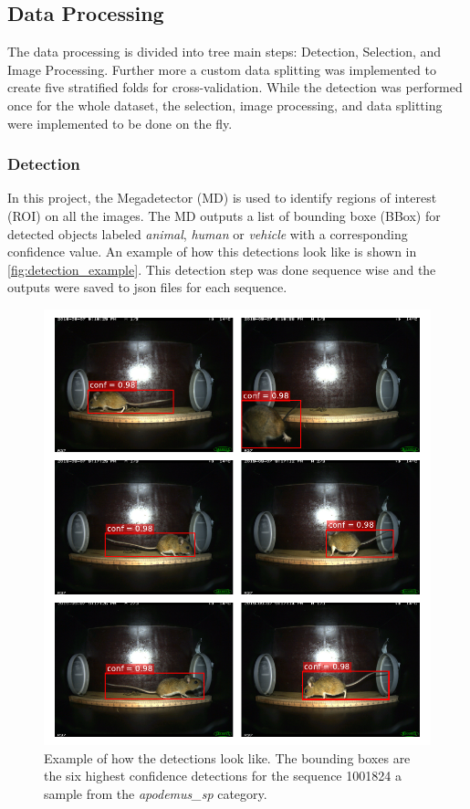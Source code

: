     \subsection{Data Processing}

    The data processing is divided into tree main steps: Detection, Selection, and Image Processing. 
    Further more a custom data splitting was implemented to create five stratified folds for cross-validation.
    While the detection was performed once for the whole dataset, the selection, image processing, and data splitting were implemented to be done on the fly.

        \subsubsection{Detection}
    
        In this project, the Megadetector (MD) \autocite{morrisEfficientPipelineCamera2025} is used to identify regions of interest (ROI) on all the images.
        The MD outputs a list of bounding boxe (BBox) for detected objects labeled \textit{animal}, \textit{human} or \textit{vehicle} with a corresponding confidence value.
        An example of how this detections look like is shown in \autoref{fig:detection_example}.
        This detection step was done sequence wise and the outputs were saved to json files for each sequence.

        \begin{figure}[ht]
        \centering
        \includegraphics{figures/detections_on_a_sequence.pdf}
        \caption{Example of how the detections look like. The bounding boxes are the six highest confidence detections for the sequence 1001824 a sample from the \textit{apodemus\_sp} category.}
        \label{fig:detection_example}
        \end{figure}

